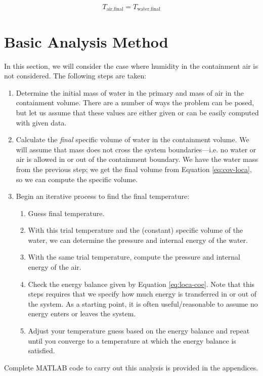\begin{equation}
T_{\text{air,final}} = T_{\text{water,final}}
\label{eq:loca-thermal-eq}
\end{equation}

\section{Basic Analysis Method}
In this section, we will consider the case where humidity in the containment air is not considered.  The following steps are taken:

\begin{enumerate}
\item Determine the initial mass of water in the primary and mass of air in the containment volume.  There are a number of ways the problem can be posed, but let us assume that these values are either given or can be easily computed with given data.

\item Calculate the \emph{final} specific volume of water in the containment volume.  We will assume that mass does not cross the system boundaries---i.e. no water or air is allowed in or out of the containment boundary.  We have the water mass from the previous step; we get the final volume from Equation \ref{eq:cov-loca}, so we can compute the specific volume.

\item Begin an iterative process to find the final temperature:
\begin{enumerate}
\item Guess final temperature.
\item With this trial temperature and the (constant) specific volume of the water, we can determine the pressure and internal energy of the water.
\item With the same trial temperature, compute the pressure and internal energy of the air.

\item Check the energy balance given by Equation \ref{eq:loca-coe}.  Note that this steps requires that we specify how much energy is transferred in or out of the system.  As a starting point, it is often useful/reasonable to assume no energy enters or leaves the system.
\item Adjust your temperature guess based on the energy balance and repeat until you converge to a temperature at which the energy balance is satisfied.
\end{enumerate}
\end{enumerate}
Complete MATLAB code to carry out this analysis is provided in the appendices.

